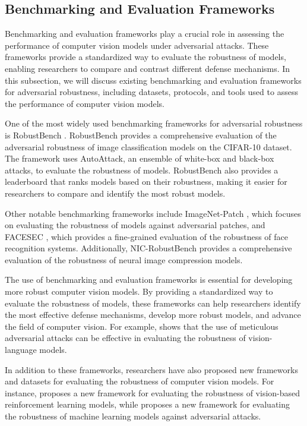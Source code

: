 \documentclass[11pt]{article}
\begin{document}
\subsection{Benchmarking and Evaluation Frameworks}

Benchmarking and evaluation frameworks play a crucial role in assessing the performance of computer vision models under adversarial attacks. These frameworks provide a standardized way to evaluate the robustness of models, enabling researchers to compare and contrast different defense mechanisms. In this subsection, we will discuss existing benchmarking and evaluation frameworks for adversarial robustness, including datasets, protocols, and tools used to assess the performance of computer vision models.

One of the most widely used benchmarking frameworks for adversarial robustness is RobustBench \cite{ref191}. RobustBench provides a comprehensive evaluation of the adversarial robustness of image classification models on the CIFAR-10 dataset. The framework uses AutoAttack, an ensemble of white-box and black-box attacks, to evaluate the robustness of models. RobustBench also provides a leaderboard that ranks models based on their robustness, making it easier for researchers to compare and identify the most robust models.

Other notable benchmarking frameworks include ImageNet-Patch \cite{ref192}, which focuses on evaluating the robustness of models against adversarial patches, and FACESEC \cite{ref166}, which provides a fine-grained evaluation of the robustness of face recognition systems. Additionally, NIC-RobustBench \cite{ref193} provides a comprehensive evaluation of the robustness of neural image compression models.

The use of benchmarking and evaluation frameworks is essential for developing more robust computer vision models. By providing a standardized way to evaluate the robustness of models, these frameworks can help researchers identify the most effective defense mechanisms, develop more robust models, and advance the field of computer vision. For example, \cite{ref194} shows that the use of meticulous adversarial attacks can be effective in evaluating the robustness of vision-language models.

In addition to these frameworks, researchers have also proposed new frameworks and datasets for evaluating the robustness of computer vision models. For instance, \cite{ref152} proposes a new framework for evaluating the robustness of vision-based reinforcement learning models, while \cite{ref195} proposes a new framework for evaluating the robustness of machine learning models against adversarial attacks.
\end{document}
